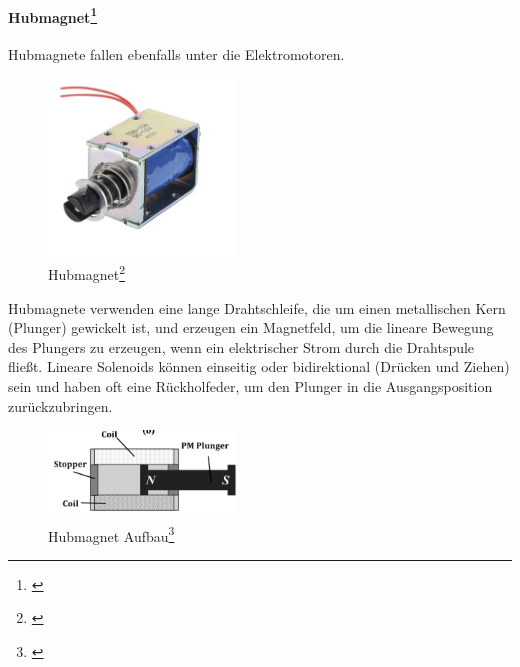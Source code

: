 \paragraph{Hubmagnet\footnote{\cite*[siehe ][Chapter 1-2]{SolenoidDesign}}}
Hubmagnete fallen ebenfalls unter die Elektromotoren.
\begin{figure}[htbp]
	\centering
	\includegraphics[width=5cm]{img/Hubmagnet}
	\caption{Hubmagnet\footnote{\cite*[siehe ][]{ReicheltHubmagnetMonostabil}}}
	\label{fig:Hubmagnet}
\end{figure}

Hubmagnete verwenden eine lange
Drahtschleife, die um einen metallischen Kern (Plunger) gewickelt ist, und erzeugen ein Magnetfeld, um die lineare Bewegung
des Plungers zu erzeugen, wenn ein elektrischer Strom durch die Drahtspule fließt. Lineare Solenoids können einseitig oder
bidirektional (Drücken und Ziehen) sein und haben oft eine Rückholfeder, um den Plunger in die Ausgangsposition zurückzubringen.
\begin{figure}[htbp]
	\centering
	\includegraphics[width=5cm]{img/AufbauMagnet}
	\caption{Hubmagnet Aufbau\footnote{\cite*[siehe ][]{SolenoidDesign}}}
	\label{fig:HubmagnetAufbau}
\end{figure}

